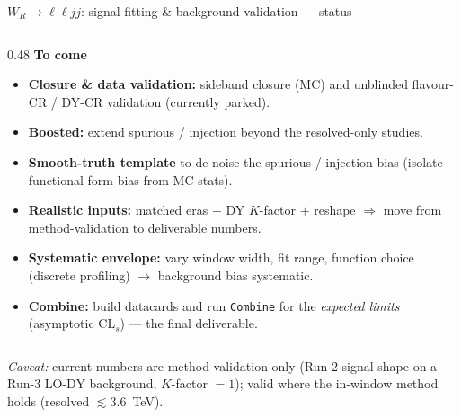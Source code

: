 \begin{frame}{$W_R \to \ell\ell jj$: signal fitting \& background validation --- status}
\begin{columns}[T]
  \begin{column}{0.48\textwidth}
    \textbf{\textcolor{red!60!black}{To come}}
    \begin{itemize}\setlength{\itemsep}{2pt}
      \item \textbf{Closure \& data validation:} sideband closure (MC) and
            unblinded flavour-CR / DY-CR validation (currently parked).
      \item \textbf{Boosted:} extend spurious / injection beyond the
            resolved-only studies.
      \item \textbf{Smooth-truth template} to de-noise the spurious / injection
            bias (isolate functional-form bias from MC stats).
      \item \textbf{Realistic inputs:} matched eras $+$ DY $K$-factor $+$
            reshape $\Rightarrow$ move from method-validation to deliverable
            numbers.
      \item \textbf{Systematic envelope:} vary window width, fit range, function
            choice (discrete profiling) $\to$ background bias systematic.
      \item \textbf{\textcolor{blue!60!black}{Combine:}} build datacards and run
            \texttt{Combine} for the \emph{expected limits} (asymptotic
            $\mathrm{CL}_s$) --- the final deliverable.
    \end{itemize}
  \end{column}

  \end{columns}

  \vspace{4pt}
  \footnotesize
  \textit{Caveat:} current numbers are method-validation only (Run-2 signal
  shape on a Run-3 LO-DY background, $K$-factor $=1$); valid where the in-window
  method holds (resolved $\lesssim 3.6$~TeV).
\end{frame}


